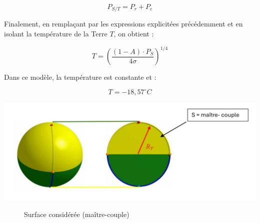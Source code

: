 \documentclass[a4paper,11pt]{article}
\begin{document}
\[ P_{S/T} = P_r + P_e \]

Finalement, en remplaçant par les expressions explicitées précédemment et en isolant la température de la Terre $T$, on obtient :

\[ T = \left(\dfrac{(1 - A) \cdot P_S}{4\sigma}\right)^{1/4} \]

Dans ce modèle, la température est constante et  :

\[ T = -18,57 ^{\circ} C \]


\begin{adjustbox}{center}
\includegraphics[scale=0.9]{Schema_maitre_couple}
\end{adjustbox}
\begin{figure}[h]
  \centering
  \caption{Surface considérée (maître-couple)}
\end{figure}
\end{document}
